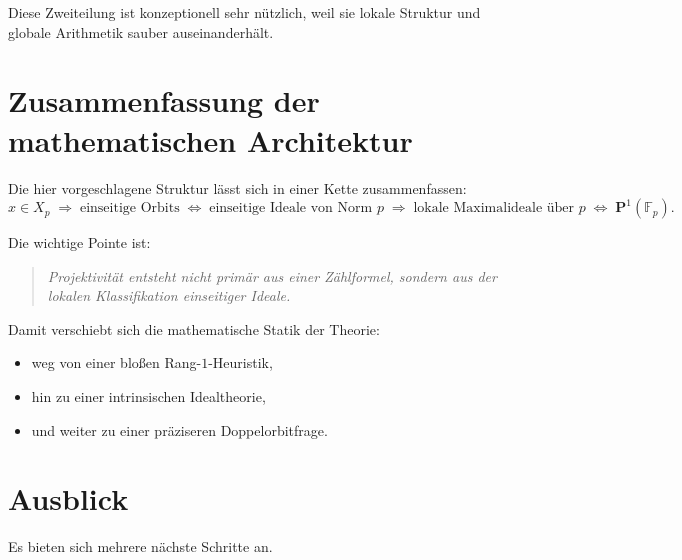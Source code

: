 \documentclass[12pt,a4paper]{article}
\theoremstyle{definition}
\newcommand{\Fp}{\mathbb{F}_p}
\begin{document}
	Diese Zweiteilung ist konzeptionell sehr nützlich, weil sie lokale Struktur und globale Arithmetik sauber auseinanderhält.
	
	\section{Zusammenfassung der mathematischen Architektur}
	
	Die hier vorgeschlagene Struktur lässt sich in einer Kette zusammenfassen:
	\[
	x\in X_p
	\;\Longrightarrow\;
	\text{einseitige Orbits}
	\;\Longleftrightarrow\;
	\text{einseitige Ideale von Norm }p
	\;\Longrightarrow\;
	\text{lokale Maximalideale über }p
	\;\Longleftrightarrow\;
	\mathbf P^1(\Fp).
	\]
	
	Die wichtige Pointe ist:
	\begin{quote}
		\emph{Projektivität entsteht nicht primär aus einer Zählformel, sondern aus der lokalen Klassifikation einseitiger Ideale.}
	\end{quote}
	
	Damit verschiebt sich die mathematische Statik der Theorie:
	
	\begin{itemize}
		\item weg von einer bloßen Rang-\(1\)-Heuristik,
		\item hin zu einer intrinsischen Idealtheorie,
		\item und weiter zu einer präziseren Doppelorbitfrage.
	\end{itemize}
	
	\section{Ausblick}
	
	Es bieten sich mehrere nächste Schritte an.
	
\end{document}
